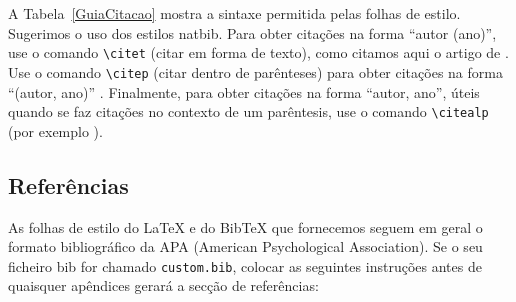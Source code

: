 \documentclass[11pt]{article}
\begin{document}
A Tabela~\ref{GuiaCitacao} mostra a sintaxe permitida pelas folhas de estilo.
Sugerimos o uso dos estilos natbib.
Para obter citações na forma ``autor (ano)'', use o comando  \verb|\citet| (citar em forma de texto), como citamos aqui o artigo de \citet{Gusfield:97}.
Use o comando \verb|\citep| (citar dentro de parênteses) para obter citações na forma ``(autor, ano)'' \citep{Gusfield:97}.
Finalmente, para obter citações na forma ``autor, ano'', úteis quando se faz citações no contexto de um parêntesis, use o comando \verb|\citealp| (por exemplo \citealp{Gusfield:97}).


\subsection{Referências}

\nocite{Ando2005,andrew2007scalable,rasooli-tetrault-2015}

As folhas de estilo do \LaTeX{} e do Bib\TeX{} que fornecemos seguem em geral o formato bibliográfico da APA (American Psychological Association).
Se o seu ficheiro bib for chamado \texttt{custom.bib},
colocar as seguintes instruções antes de quaisquer apêndices gerará a secção de referências:
\begin{quote}
\begin{verbatim}

\end{verbatim}
\end{quote}
\end{document}
